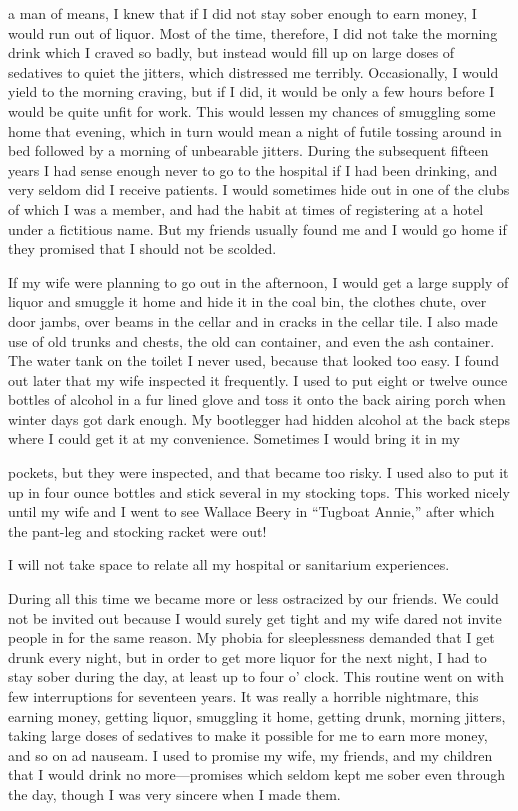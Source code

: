 \begin{biblechapter}
a man of means, I knew that if I did not stay sober enough to earn money, I would run out of liquor. Most of the time, therefore, I did not take the morning drink which I craved so badly, but instead would fill up on large doses of sedatives to quiet the jitters, which distressed me terribly. Occasionally, I would yield to the morning craving, but if I did, it would be only a few hours before I would be quite unfit for work. This would lessen my chances of smuggling some home that evening, which in turn would mean a night of futile tossing around in bed followed by a morning of unbearable jitters. During the subsequent fifteen years I had sense enough never to go to the hospital if I had been drinking, and very seldom did I receive patients. I would sometimes hide out in one of the clubs of which I was a member, and had the habit at times of registering at a hotel under a fictitious name. But my friends usually found me and I would go home if they promised that I should not be scolded.

If my wife were planning to go out in the afternoon, I would get a large supply of liquor and smuggle it home and hide it in the coal bin, the clothes chute, over door jambs, over beams in the cellar and in cracks in the cellar tile. I also made use of old trunks and chests, the old can container, and even the ash container. The water tank on the toilet I never used, because that looked too easy. I found out later that my wife inspected it frequently. I used to put eight or twelve ounce bottles of alcohol in a fur lined glove and toss it onto the back airing porch when winter days got dark enough. My bootlegger had hidden alcohol at the back steps where I could get it at my convenience. Sometimes I would bring it in my

pockets, but they were inspected, and that became too risky. I used also to put it up in four ounce bottles and stick several in my stocking tops. This worked nicely until my wife and I went to see Wallace Beery in “Tugboat Annie,” after which the pant-leg and stocking racket were out!

I will not take space to relate all my hospital or sanitarium experiences.

During all this time we became more or less ostracized by our friends. We could not be invited out because I would surely get tight and my wife dared not invite people in for the same reason. My phobia for sleeplessness demanded that I get drunk every night, but in order to get more liquor for the next night, I had to stay sober during the day, at least up to four o’ clock. This routine went on with few interruptions for seventeen years. It was really a horrible nightmare, this earning money, getting liquor, smuggling it home, getting drunk, morning jitters, taking large doses of sedatives to make it possible for me to earn more money, and so on ad nauseam. I used to promise my wife, my friends, and my children that I would drink no more—promises which seldom kept me sober even through the day, though I was very sincere when I made them.


\end{biblechapter}
